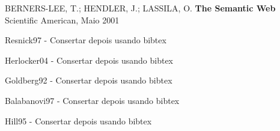 \begin{thebibliography}{99}

 


    BERNERS-LEE, T.; HENDLER, J.; LASSILA, O.
    \textbf{The Semantic Web}
    Scientific American, Maio 2001

 Resnick97 - Consertar depois usando bibtex

 Herlocker04 - Consertar depois usando bibtex



 Goldberg92 - Consertar depois usando bibtex


 Balabanovi97 - Consertar depois usando bibtex

 Hill95 - Consertar depois usando bibtex


\end{thebibliography}
